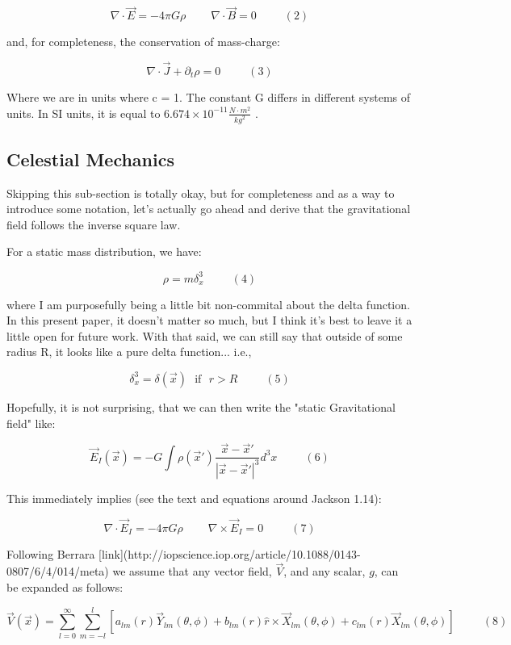 \documentclass {article}
\begin{document}
$$\nabla \cdot \vec E = -4 \pi G \rho ~~~~~~~~~~ \nabla \cdot \vec B = 0   ~~~~~~~~~~~ (2)$$

and, for completeness, the conservation of mass-charge:

$$\nabla \cdot \vec J + \partial_t \rho = 0 ~~~~~~~~~~~ (3)$$

Where we are in units where c = 1. The constant G differs in different systems of units. In SI units, it is equal to $6.674 \times 10^{-11} \frac {N \cdot m^2}{kg^2}$ .

\subsection{Celestial Mechanics}

Skipping this sub-section is totally okay, but for completeness and as a way to introduce some notation, let's actually go ahead and derive that the gravitational field follows the inverse square law. 

For a static mass distribution, we have:

$$\rho = m \delta^3_x  ~~~~~~~~~~~ (4)$$

where I am purposefully being a little bit non-commital about the delta function. In this present paper, it doesn't matter so much, but I think it's best to leave it a little open for future work. With that said, we can still say that outside of some radius R, it looks like a pure delta function... i.e.,

$$\delta^3_x = \delta(\vec x) ~~~ \textrm{if} ~~~ r > R ~~~~~~~~~~~ (5)$$

Hopefully, it is not surprising, that we can then write the "static Gravitational field" like:

$$\vec{E}_I(\vec x) = -G \int \rho(\vec x') \frac {\vec x - \vec x'}{|\vec x - \vec x'|^3} d^3x ~~~~~~~~~~~ (6)$$

This immediately implies (see the text and equations around Jackson 1.14):

$$\nabla \cdot \vec{E}_I = -4 \pi G \rho ~~~~~~~~~~ \nabla \times \vec{E}_I = 0 ~~~~~~~~~~~ (7)$$

Following Berrara [link](http://iopscience.iop.org/article/10.1088/0143-0807/6/4/014/meta) we assume that any vector field, $\vec V$, and any scalar, $g$, can be expanded as follows:

$$\vec V (\vec x) = \sum_{l=0}^{\infty} \sum_{m=-l}^{l} \left[a_{lm}(r) \vec Y_{lm}(\theta, \phi) +b_{lm}(r) \hat r \times \vec X_{lm} (\theta, \phi) +c_{lm}(r) \vec X_{lm} (\theta, \phi) \right] ~~~~~~~~~~~ (8)$$
\end{document}
